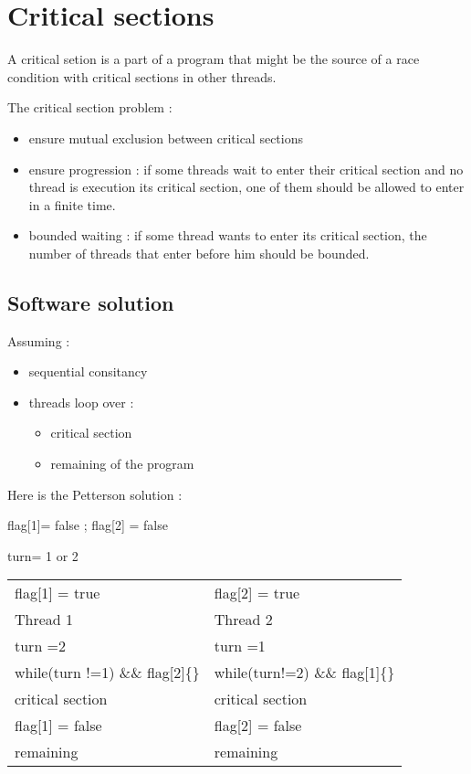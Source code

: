 \documentclass[a4paper,10pt]{article}
\begin{document}
\section{Critical sections}

A critical setion is a part of a program that might be the source of a race condition with critical sections in other threads.

The critical section problem :
\begin{itemize}
\item ensure mutual exclusion between critical sections
\item ensure progression : if some threads wait to enter their critical section and no thread is execution its critical section, one of them should be allowed to enter in a finite time.
\item bounded waiting : if some thread wants to enter its critical section, the number of threads that enter before him should be bounded. 
\end{itemize}

\subsection{Software solution}

Assuming :

\begin{itemize}
\item sequential consitancy
\item threads loop over :
\begin{itemize}
\item critical section
\item remaining of the program
\end{itemize}
\end{itemize}

Here is the Petterson solution :

\begin{centering}
flag[1]= false ; flag[2] = false

turn= 1 or 2

\begin{tabular}{|ll|}
\hline
	flag[1] = true & flag[2] = true\\
	Thread 1 & Thread 2 \\
	turn =2 & turn =1 \\
	while(turn !=1) \&\& flag[2]\{\} & while(turn!=2) \&\& flag[1]\{\}\\
	critical section & critical section\\
	flag[1] = false & flag[2] = false\\
	remaining & remaining\\
\hline
\end{tabular}

\end{centering}
\end{document}
